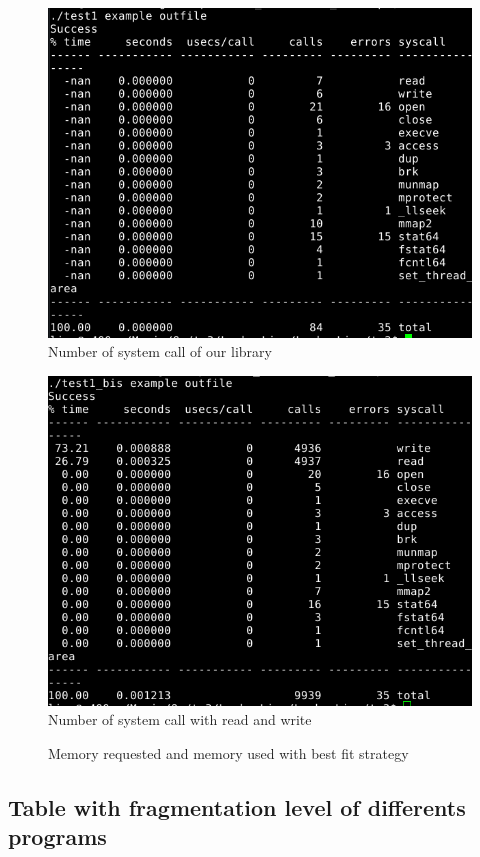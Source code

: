 \documentclass[a4paper,10pt]{article}
\begin{document}
\begin{figure}[ht]
\center 
\includegraphics[width=0.85\linewidth]{my_strace.png}
\caption{Number of system call of our library}
\label{first}
\end{figure}
\begin{figure}[ht]
\center 
\includegraphics[width=0.85\linewidth]{syscall_strace.png}
\caption{Number of system call with read and write}
\label{worst}
\end{figure}
\begin{figure}[ht]
\center 
\caption{Memory requested and memory used with best fit strategy}
\label{best}
\end{figure}

\subsection{Table with fragmentation level of differents programs}
\end{document}
